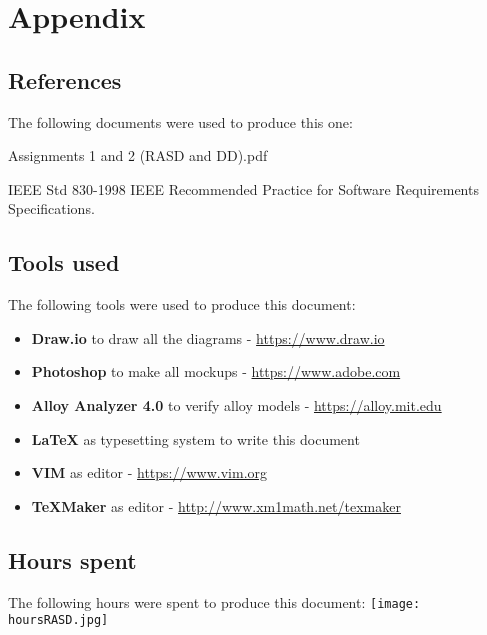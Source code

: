 \pagebreak
\section{Appendix}

\subsection*{References}
The following documents were used to produce this one:
\begingroup
    \renewcommand{\section}[2]{}%
    \begin{thebibliography}{9}
        Assignments 1 and 2 (RASD and DD).pdf

        IEEE Std 830-1998 IEEE Recommended Practice for Software Requirements
        Specifications.
    \end{thebibliography}
\endgroup

\subsection*{Tools used}
The following tools were used to produce this document:
\begin{itemize}
    \item \textbf{Draw.io} to draw all the diagrams - \url{https://www.draw.io}
    \item \textbf{Photoshop} to make all mockups - \url{https://www.adobe.com}
    \item \textbf{Alloy Analyzer 4.0} to verify alloy models - \url{https://alloy.mit.edu}
    \item \textbf{LaTeX} as typesetting system to write this document
    \item \textbf{VIM} as editor - \url{https://www.vim.org}
    \item \textbf{TeXMaker} as editor - \url{http://www.xm1math.net/texmaker}
\end{itemize}

\subsection*{Hours spent}
The following hours were spent to produce this document:
\vfill
\texttt{[image: hoursRASD.jpg]}
